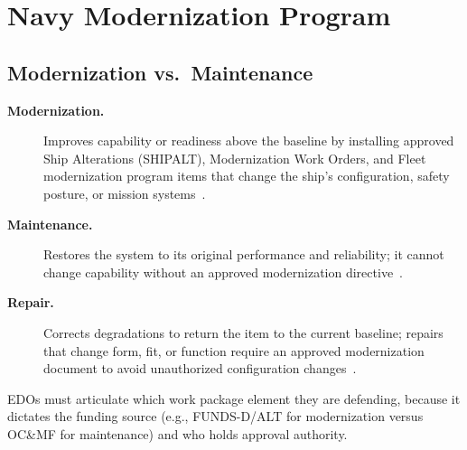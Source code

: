 \documentclass[../main.tex]{subfiles}
\begin{document}
\section{Navy Modernization Program}
\minibib

\subsection{Modernization vs.\ Maintenance}
\begin{description}
\item[\textbf{Modernization.}] Improves capability or readiness above the baseline by installing approved Ship Alterations (SHIPALT), Modernization Work Orders, and Fleet modernization program items that change the ship's configuration, safety posture, or mission systems~\autocite{edo-4-1-2-navy-modernization-2025,OPNAVINST4700-7M}.
\item[\textbf{Maintenance.}] Restores the system to its original performance and reliability; it cannot change capability without an approved modernization directive~\autocite{edo-4-1-2-navy-modernization-2025,COMFLTFORCOMINST4790-3}.
\item[\textbf{Repair.}] Corrects degradations to return the item to the current baseline; repairs that change form, fit, or function require an approved modernization document to avoid unauthorized configuration changes~\autocite{OPNAVINST4700-7M}.
\end{description}
EDOs must articulate which work package element they are defending, because it dictates the funding source (e.g., FUNDS-D/ALT for modernization versus OC\&MF for maintenance) and who holds approval authority.
\end{document}
